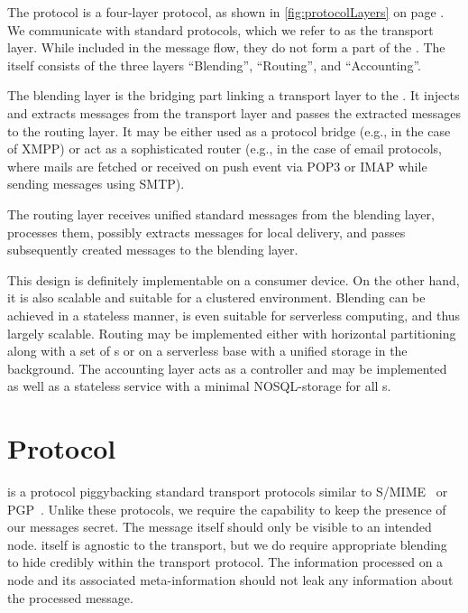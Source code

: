 The protocol is a four-layer protocol, as shown in \cref{fig:protocolLayers} on page \pageref{fig:protocolLayers}. We communicate with standard protocols, which we refer to as the transport layer. While included in the message flow, they do not form a part of the \VortexNode. The \VortexNode{} itself consists of the three layers ``Blending'', ``Routing'', and ``Accounting''.

The blending layer is the bridging part linking a transport layer to the \VortexNode{}. It injects and extracts messages from the transport layer and passes the extracted messages to the routing layer. It may be either used as a protocol bridge (e.g., in the case of XMPP) or act as a sophisticated router (e.g., in the case of email protocols, where mails are fetched or received on push event via POP3 or IMAP while sending messages using SMTP).

The routing layer receives unified standard messages from the blending layer, processes them, possibly extracts messages for local delivery, and passes subsequently created messages to the blending layer.

This design is definitely implementable on a consumer device. On the other hand, it is also scalable and suitable for a clustered environment. Blending can be achieved in a stateless manner, is even suitable for serverless computing, and thus largely scalable. Routing may be implemented either with horizontal partitioning along with a set of s or on a serverless base with a unified storage in the background. The accounting layer acts as a controller and may be implemented as well as a stateless service with a minimal NOSQL-storage for all s. 

\chapter{Protocol}\label{sec:protocol}
\MessageVortex{} is a protocol piggybacking standard transport protocols similar to S/MIME~\cite{rfc2015} or PGP~\cite{PGP}. Unlike these protocols, we require the capability to keep the presence of our messages secret. The message itself should only be visible to an intended node.\MessageVortex{} itself is agnostic to the transport, but we do require appropriate blending to hide credibly within the transport protocol. The information processed on a node and its associated meta-information should not leak any information about the processed message. 

